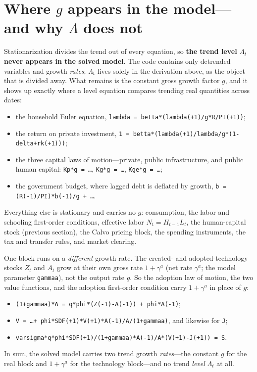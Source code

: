 \documentclass[11pt]{article}
\begin{document}
\section{Where $g$ appears in the model---and why $\Lambda$ does not}

Stationarization divides the trend out of every equation, so \textbf{the trend level
$\Lambda_t$ never appears in the solved model}. The code contains only detrended
variables and growth \emph{rates}; $\Lambda_t$ lives solely in the derivation above, as
the object that is divided away. What remains is the constant gross growth factor $g$, and it
shows up exactly where a level equation compares trending real quantities across dates:
\begin{itemize}
    \item the household Euler equation, \texttt{lambda = betta*(lambda(+1)/g*R/PI(+1))};
    \item the return on private investment, \texttt{1 = betta*(lambda(+1)/lambda/g*(1-delta+rk(+1)))};
    \item the three capital laws of motion---private, public infrastructure, and public
          human capital: \texttt{Kp*g = \dots}, \texttt{Kg*g = \dots}, \texttt{Kge*g = \dots};
    \item the government budget, where lagged debt is deflated by growth,
          \texttt{b = (R(-1)/PI)*b(-1)/g + \dots}.
\end{itemize}
Everything else is stationary and carries no $g$: consumption, the labor and schooling
first-order conditions, effective labor $N_t = H_{t-1}L_t$, the human-capital stock
(previous section), the Calvo pricing block, the spending instruments, the tax and
transfer rules, and market clearing.

One block runs on a \emph{different} growth rate. The created- and adopted-technology
stocks $Z_t$ and $A_t$ grow at their own gross rate $1+\gamma^a$ (net rate $\gamma^a$;
the model parameter \texttt{gammaa}), not the output rate $g$. So the adoption law of
motion, the two value functions, and the adoption first-order condition carry
$1+\gamma^a$ in place of $g$:
\begin{itemize}
    \item \texttt{(1+gammaa)*A = q*phi*(Z(-1)-A(-1)) + phi*A(-1)};
    \item \texttt{V = \dots + phi*SDF(+1)*V(+1)*A(-1)/A/(1+gammaa)}, and likewise for \texttt{J};
    \item \texttt{varsigma*q*phi*SDF(+1)/(1+gammaa)*A(-1)/A*(V(+1)-J(+1)) = S}.
\end{itemize}
In sum, the solved model carries two trend growth \emph{rates}---the constant $g$ for the real block
and $1+\gamma^a$ for the technology block---and no trend \emph{level} $\Lambda_t$ at all.
\end{document}
